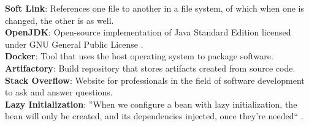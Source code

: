 {\textbf{Soft Link}: References one file to another in a file system, of which when one is changed, the other is as well.\\
\textbf{OpenJDK}: Open-source implementation of Java Standard Edition licensed under GNU General Public License \cite{wikiopenjdk:online}.\\
\textbf{Docker}: Tool that uses the host operating system to package software.\\
\textbf{Artifactory}: Build repository that stores artifacts created from source code.\\
\textbf{Stack Overflow}: Website for professionals in the field of software development to ask and answer questions.\\
\textbf{Lazy Initialization}:  ''When we configure a bean with lazy initialization, the bean will only be created, and its dependencies injected, once they're needed`` \cite{springBootLazyInitialization}.\\
}